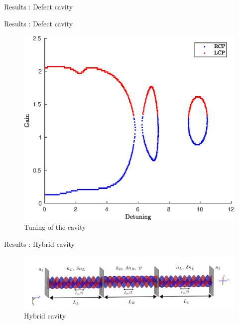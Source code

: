 \documentclass[aspectratio=169]{beamer}
\begin{document}
\begin{frame}{Results : Defect cavity}
\begin{figure}
\begin{subfigure}{0.49\linewidth}
		\end{subfigure}
	\end{figure}
\end{frame}

\begin{frame}{Results : Defect cavity}
	\begin{figure}
		\centering
		\includegraphics[width=0.5\linewidth]{plots/defect/tuning}
		\caption{Tuning of the cavity}
	\end{figure}
\end{frame}

\begin{frame}{Results : Hybrid cavity}
\begin{figure}
	\centering
	\includegraphics[width=\linewidth]{images/hybrid.png}
	\caption{Hybrid cavity}
\end{figure}
\end{frame}
\end{document}
